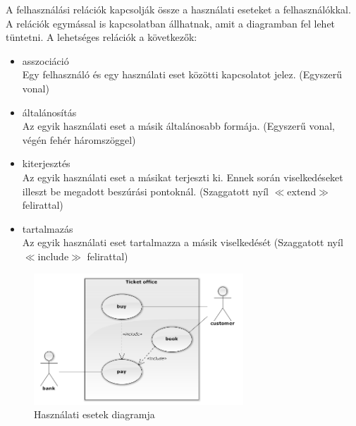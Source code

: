 \documentclass[margin=0px]{article}
\begin{document}
		A felhasználási relációk kapcsolják össze a használati eseteket a
		felhasználókkal. A relációk egymással is kapcsolatban állhatnak, amit
		a diagramban fel lehet tüntetni. A lehetséges relációk a következők:
		\begin{itemize}
			\item asszociáció \\
				Egy felhasználó és egy használati eset közötti kapcsolatot jelez. (Egyszerű vonal)
			\item általánosítás \\
				Az egyik használati eset a másik általánosabb formája. (Egyszerű vonal, végén fehér háromszöggel)
			\item kiterjesztés \\
				Az egyik használati eset a másikat terjeszti ki. Ennek
				során viselkedéseket illeszt be megadott beszúrási pontoknál. (Szaggatott nyíl $\ll$extend$\gg$ felirattal)
			\item tartalmazás \\
				Az egyik használati eset tartalmazza a másik viselkedését  (Szaggatott nyíl $\ll$include$\gg$ felirattal)
		\end{itemize}
		
		\begin{figure}[H]
			\centering
			\includegraphics[width=0.7\textwidth]{img/hasznalatieset.png}
			\caption{Használati esetek diagramja}
		\end{figure}
\end{document}
